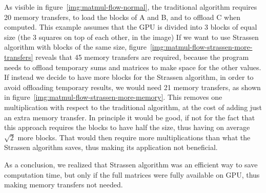 As visible in figure~\ref{img:matmul-flow-normal}, the traditional algorithm requires 20 memory transfers, to load the blocks of A and B, and to offload C when computed.
This example assumes that the GPU is divided into 3 blocks of equal size (the 3 squares on top of each other, in the image)
If we want to use Strassen algorithm with blocks of the same size, figure~\ref{img:matmul-flow-strassen-more-transfers} reveals that 45 memory transfers are required, because the program needs to offload temporary sums and matrices to make space for the other values.
If instead we decide to have more blocks for the Strassen algorithm, in order to avoid offloading temporary results, we would need 21 memory transfers, as shown in figure~\ref{img:matmul-flow-strassen-more-memory}.
This removes one multiplication with respect to the traditional algorithm, at the cost of adding just an extra memory transfer.
In principle it would be good, if not for the fact that this approach requires the blocks to have half the size, thus having on average $\sqrt{2}$ more blocks.
That would then require more multiplications than what the Strassen algorithm saves, thus making its application not beneficial.

As a conclusion, we realized that Strassen algorithm was an efficient way to save computation time, but only if the full matrices were fully available on GPU, thus making memory transfers not needed.
